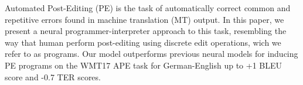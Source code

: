 Automated Post-Editing (PE) is the task of automatically correct common and repetitive errors found in machine translation (MT) output. In this paper, we present a neural programmer-interpreter approach to this task, resembling the way that human perform post-editing using discrete edit operations, wich we refer to as programs. Our model outperforms previous neural models for inducing PE programs on the WMT17 APE task for German-English up to +1 BLEU score and -0.7 TER scores.
